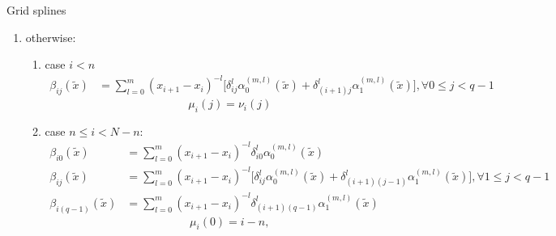 \documentclass[11pt]{article}
\begin{document}
\begin{small}
\begin{paragraph}{Grid splines}
\begin{enumerate}
\begin{enumerate}
                    \item
                        otherwise:
                        \begin{enumerate}
                            \item
                                case $i < n$
                                \begin{align}
                                    \beta_{ij}(\tilde{x}) &=
                                        \sum_{l = 0}^m
                                        (x_{i+1} - x_i)^{-l}
                                        \Big[\delta_{ij}^l \alpha_0^{(m, l)}(\tilde{x}) +
                                             \delta_{(i+1)j}^l \alpha_1^{(m, l)}(\tilde{x})\Big],
                                    \forall 0 \leq j < q - 1
                                \end{align}
                                \begin{equation}
                                    \mu_i(j) = \nu_i(j)
                                \end{equation}
                            \item
                                case $n \leq i < N - n$:
                                \begin{align}
                                    \beta_{i0}(\tilde{x}) &=
                                        \sum_{l = 0}^m
                                        (x_{i+1} - x_i)^{-l}
                                        \delta_{i0}^l \alpha_0^{(m, l)}(\tilde{x}) \\
                                    \beta_{ij}(\tilde{x}) &=
                                        \sum_{l = 0}^m
                                        (x_{i+1} - x_i)^{-l}
                                        \Big[\delta_{ij}^l \alpha_0^{(m, l)}(\tilde{x}) +
                                             \delta_{(i+1)(j-1)}^l \alpha_1^{(m, l)}(\tilde{x})\Big],
                                    \forall 1 \leq j < q-1 \\
                                    \beta_{i(q-1)}(\tilde{x}) &=
                                        \sum_{l = 0}^m
                                        (x_{i+1} - x_i)^{-l}
                                        \delta_{(i+1)(q-1)}^l \alpha_1^{(m, l)}(\tilde{x})
                                \end{align}
                                \begin{equation}
                                    \mu_i(0) = i-n,

\end{equation}
\end{enumerate}
\end{enumerate}
\end{enumerate}
\end{paragraph}
\end{small}
\end{document}
